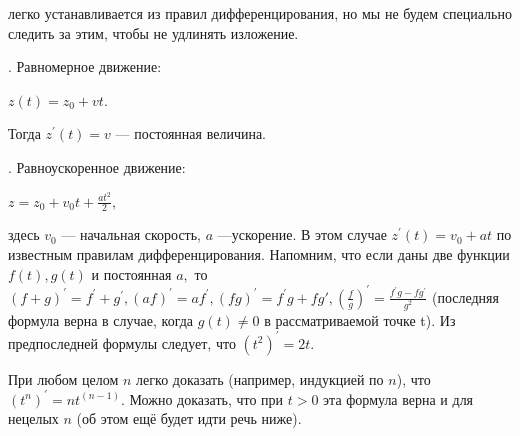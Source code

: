 \documentclass[10pt]{article}
\begin{document}
 
\noindent легко устанавливается из правил дифференцирования, но мы не будем специально следить за этим, чтобы не удлинять изложение.

. Равномерное движение: 

\begin{center} 
    \begin{math} 
        z(t)=z_0+vt. 
    \end{math} 
\end{center} 
Тогда \begin{math} z^{'}(t)=v \end{math} — постоянная величина. 
 
. Равноускоренное движение: 
\begin{center} 
    \begin{math} 
        z=z_0+v_0 t+\frac{at^2}{2},  
    \end{math} 
\end{center} 
 
\noindent здесь \begin{math} v_0 \end{math} — начальная скорость, \begin{math} a \end{math} —ускорение. В этом случае \begin{math} z^{'}(t)=v_0+at \end{math} по известным правилам дифференцирования. Напомним, что если даны две функции  \begin{math} f(t), g(t) \end{math} и постоянная \begin{math} a, \end{math} то 
\begin{math} 
(f+g)^{'} = f^{'}+g^{'}, (af)^{'} = af^{'}, (fg)^{'} = f^{'}g+fg{'}, (\frac{f}{g})^{'} = \frac{f^{'}g-fg^{'}}{g^{2}} 
\end{math} (последняя формула верна в случае, когда \begin{math} g(t)\neq0 \end{math} в рассматриваемой точке t). Из предпоследней формулы следует, что \begin{math} (t^{2})^{'}=2t.\end{math}

При любом целом \begin{math} n \end{math} легко доказать (например, индукцией по \begin{math} n \end{math}), что \begin{math} (t^{n})^{'}=nt^{(n-1)}.\end{math} Можно доказать, что при \begin{math} t>0 \end{math} эта формула верна и для нецелых \begin{math} n \end{math} (об этом ещё будет идти речь ниже). 
 
\end{document}
